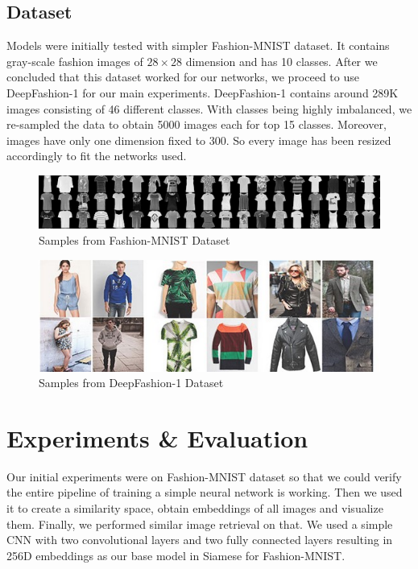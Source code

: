 \documentclass{article}
\begin{document}
\subsection{Dataset}
Models were initially tested with simpler Fashion-MNIST \cite{xiao2017/online} dataset. It contains gray-scale fashion images of $28\times28$ dimension and has 10 classes. After we concluded that this dataset worked for our networks, we proceed to use DeepFashion-1 \cite{liuLQWTcvpr16DeepFashion} for our main experiments. DeepFashion-1 contains around 289K images consisting of 46 different classes. With classes being highly imbalanced, we re-sampled the data to obtain 5000 images each for top 15 classes. Moreover, images have only one dimension fixed to 300. So every image has been resized accordingly to fit the networks used. 

\begin{figure}[H]
  \centering
    \includegraphics[width=\linewidth]{fmnist.jpg}
    \caption{Samples from Fashion-MNIST Dataset}
    \label{fig:fmnist}
\end{figure}

\begin{figure}[H]
  \centering
    \includegraphics[width=\linewidth]{dfimages.jpg}
    \caption{Samples from DeepFashion-1 Dataset}
    \label{fig:df}
\end{figure}

\section{Experiments \& Evaluation}

Our initial experiments were on Fashion-MNIST dataset so that we could verify the entire pipeline of training a simple neural network is working. Then we used it to create a similarity space, obtain embeddings of all images and visualize them. Finally, we performed similar image retrieval on that. We used a simple CNN with two convolutional layers and two fully connected layers resulting in 256D embeddings as our base model in Siamese for Fashion-MNIST.
\end{document}
